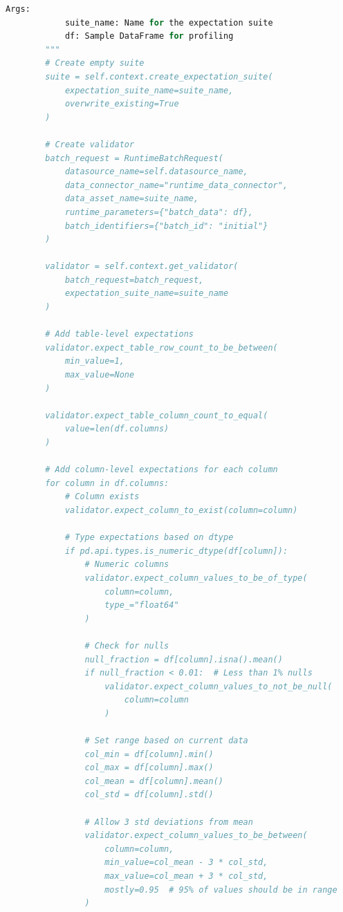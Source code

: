 \begin{lstlisting}[language=Python, caption=Great Expectations Setup and Configuration]
        Args:
            suite_name: Name for the expectation suite
            df: Sample DataFrame for profiling
        """
        # Create empty suite
        suite = self.context.create_expectation_suite(
            expectation_suite_name=suite_name,
            overwrite_existing=True
        )

        # Create validator
        batch_request = RuntimeBatchRequest(
            datasource_name=self.datasource_name,
            data_connector_name="runtime_data_connector",
            data_asset_name=suite_name,
            runtime_parameters={"batch_data": df},
            batch_identifiers={"batch_id": "initial"}
        )

        validator = self.context.get_validator(
            batch_request=batch_request,
            expectation_suite_name=suite_name
        )

        # Add table-level expectations
        validator.expect_table_row_count_to_be_between(
            min_value=1,
            max_value=None
        )

        validator.expect_table_column_count_to_equal(
            value=len(df.columns)
        )

        # Add column-level expectations for each column
        for column in df.columns:
            # Column exists
            validator.expect_column_to_exist(column=column)

            # Type expectations based on dtype
            if pd.api.types.is_numeric_dtype(df[column]):
                # Numeric columns
                validator.expect_column_values_to_be_of_type(
                    column=column,
                    type_="float64"
                )

                # Check for nulls
                null_fraction = df[column].isna().mean()
                if null_fraction < 0.01:  # Less than 1% nulls
                    validator.expect_column_values_to_not_be_null(
                        column=column
                    )

                # Set range based on current data
                col_min = df[column].min()
                col_max = df[column].max()
                col_mean = df[column].mean()
                col_std = df[column].std()

                # Allow 3 std deviations from mean
                validator.expect_column_values_to_be_between(
                    column=column,
                    min_value=col_mean - 3 * col_std,
                    max_value=col_mean + 3 * col_std,
                    mostly=0.95  # 95% of values should be in range
                )


\end{lstlisting}
